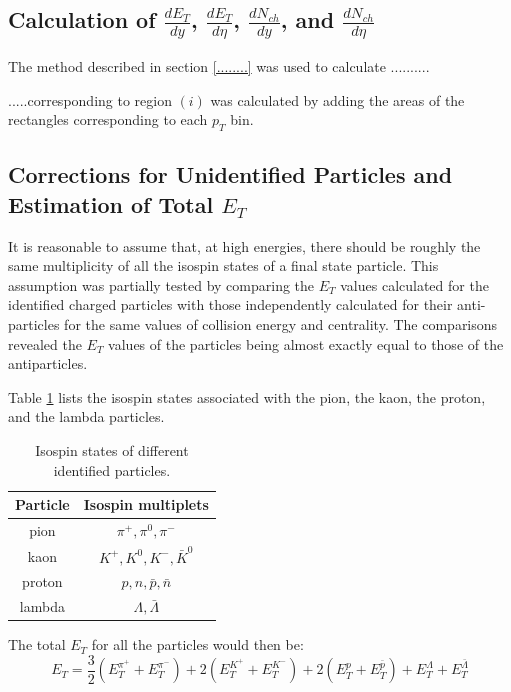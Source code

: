 \subsection{Calculation of $\frac{dE_{T}}{dy}$, $\frac{dE_{T}}{d\eta}$, $\frac{dN_{ch}}{dy}$, and $\frac{dN_{ch}}{d\eta}$}
The method described in section \ref{........} was used to calculate ..........

.....corresponding to region $(i)$ was calculated by adding the areas of the rectangles corresponding to each $p_{T}$ bin.

\subsection{Corrections for Unidentified Particles and Estimation of Total $E_{T}$}\label{corrections}
It is reasonable to assume that, at high energies, there should be roughly the same multiplicity of all the isospin states of a final state particle. This assumption was partially tested by comparing the $E_{T}$ values calculated for the identified charged particles with those independently calculated for their anti-particles for the same values of collision energy and centrality. The comparisons revealed the $E_{T}$ values of the particles being almost exactly equal to those of the antiparticles.

Table \ref{table:isospinStates} lists the isospin states associated with the pion, the kaon, the proton, and the lambda particles.
	\begin{table}[h!]
	\centering
	\begin{tabular}{|c c|}
	\hline
	Particle & Isospin multiplets \\ [0.5ex]
	\hline
	\hline
	pion & $\pi^{+}, \pi^{0}, \pi^{-} $ \\
	kaon & $K^{+}, K^{0}, K^{-}, \bar{K}^{0}$ \\
	proton & $p, n, \bar{p}, \bar{n}$  \\
	lambda & $\Lambda, \bar{\Lambda}$  \\ [1ex]
	\hline
	\end{tabular}
	\caption{Isospin states of different identified particles.}
	\label{table:isospinStates}
	\end{table}
The total $E_{T}$ for all the particles would then be:	
	\begin{equation}\label{eqn:TotET}
	E_{T} = \frac{3}{2}(E_{T}^{\pi^{+}}+E_{T}^{\pi^{-}}) + 2(E_{T}^{K^{+}}+E_{T}^{K^{-}}) + 2(E_{T}^{p}+E_{T}^{\bar{p}}) + E_{T}^{\Lambda} + E_{T}^{\bar{\Lambda}}
	\end{equation}
	
